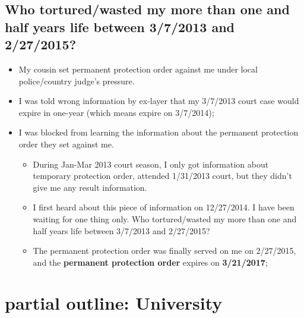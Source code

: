 \documentclass[9pt,b5paper]{article}
\begin{document}
\subsection{Who tortured/wasted my more than one and half years life between 3/7/2013 and 2/27/2015?}
\label{sec-2-2}
\begin{itemize}
\item My cousin set permanent protection order against me under local police/country judge's pressure.
\item I was told wrong information by ex-layer that my 3/7/2013 court case would expire in one-year (which means expire on 3/7/2014);
\item I was blocked from learning the information about the permanent protection order they set against me.
\begin{itemize}
\item During Jan-Mar 2013 court season, I only got information about temporary protection order, attended 1/31/2013 court, but they didn't give me any result information.
\item I first heard about this piece of information on 12/27/2014. I have been waiting for one thing only. Who tortured/wasted my more than one and half years life between 3/7/2013 and 2/27/2015?
\item The permanent protection order was finally served on me on 2/27/2015, and the \textbf{permanent protection order} expires on \textbf{3/21/2017};
\end{itemize}
\end{itemize}

\section{partial outline: University}
\label{sec-3}
\end{document}
